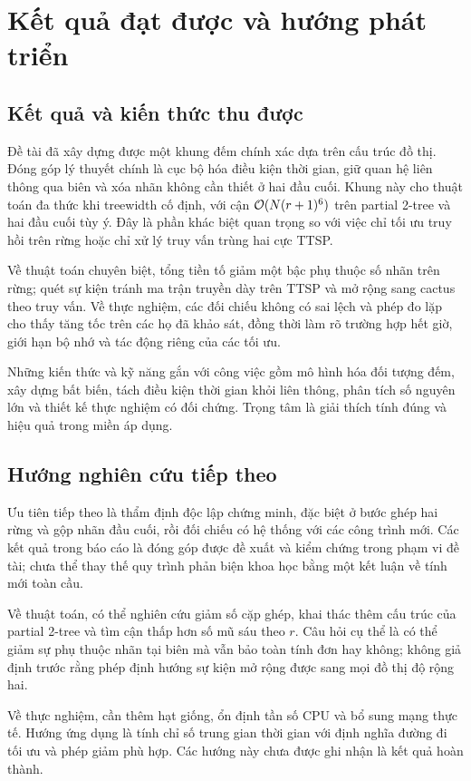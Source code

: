 \chapter{Kết quả đạt được và hướng phát triển}

\section{Kết quả và kiến thức thu được}

Đề tài đã xây dựng được một khung đếm chính xác dựa trên cấu trúc đồ thị. Đóng góp lý thuyết chính là cục bộ hóa điều kiện thời gian, giữ quan hệ liên thông qua biên và xóa nhãn không cần thiết ở hai đầu cuối. Khung này cho thuật toán đa thức khi treewidth cố định, với cận $\mathcal{O}(N(r+1)^6)$ trên partial 2-tree và hai đầu cuối tùy ý. Đây là phần khác biệt quan trọng so với việc chỉ tối ưu truy hồi trên rừng hoặc chỉ xử lý truy vấn trùng hai cực TTSP.

Về thuật toán chuyên biệt, tổng tiền tố giảm một bậc phụ thuộc số nhãn trên rừng; quét sự kiện tránh ma trận truyền dày trên TTSP và mở rộng sang cactus theo truy vấn. Về thực nghiệm, các đối chiếu không có sai lệch và phép đo lặp cho thấy tăng tốc trên các họ đã khảo sát, đồng thời làm rõ trường hợp hết giờ, giới hạn bộ nhớ và tác động riêng của các tối ưu.

Những kiến thức và kỹ năng gắn với công việc gồm mô hình hóa đối tượng đếm, xây dựng bất biến, tách điều kiện thời gian khỏi liên thông, phân tích số nguyên lớn và thiết kế thực nghiệm có đối chứng. Trọng tâm là giải thích tính đúng và hiệu quả trong miền áp dụng.

\section{Hướng nghiên cứu tiếp theo}

Ưu tiên tiếp theo là thẩm định độc lập chứng minh, đặc biệt ở bước ghép hai rừng và gộp nhãn đầu cuối, rồi đối chiếu có hệ thống với các công trình mới. Các kết quả trong báo cáo là đóng góp được đề xuất và kiểm chứng trong phạm vi đề tài; chưa thể thay thế quy trình phản biện khoa học bằng một kết luận về tính mới toàn cầu.

Về thuật toán, có thể nghiên cứu giảm số cặp ghép, khai thác thêm cấu trúc của partial 2-tree và tìm cận thấp hơn số mũ sáu theo $r$. Câu hỏi cụ thể là có thể giảm sự phụ thuộc nhãn tại biên mà vẫn bảo toàn tính đơn hay không; không giả định trước rằng phép định hướng sự kiện mở rộng được sang mọi đồ thị độ rộng hai.

Về thực nghiệm, cần thêm hạt giống, ổn định tần số CPU và bổ sung mạng thực tế. Hướng ứng dụng là tính chỉ số trung gian thời gian với định nghĩa đường đi tối ưu và phép giảm phù hợp. Các hướng này chưa được ghi nhận là kết quả hoàn thành.
\label{report:body:end}
